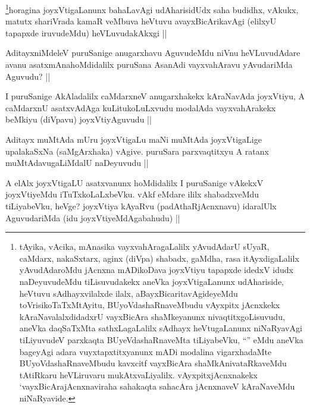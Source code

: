 \begin{artha}
\footnote[1]{tAyika, vAcika, mAnasika vayxvahAragaLalilx yAvudAdarU sUyaR, caMdarx, nakaSxtarx, aginx (diVpa) shabadx, gaMdha, rasa itAyxdigaLalilx yAvudAdaroMdu jAcnxna mADikoDava joyxVtiyu tapapxde idedxV idudx naDeyuvudeMdu tiLisuvudakekx aneVka joyxVtigaLanunx udAhariside, heVtuvu sAdhayxvilalxde ilalx, aBayxBicaritavAgideyeMdu toVrisikoTaTxMtAyitu, BUyoVdashaRnaveMbudu vAyxpitx jAcnxkekx kAraNavalalxdidadxrU vayxBicAra shaMkeyanunx nivaqtitxgoLisuvudu, aneVka daqSaTxMta sathxLagaLalilx sAdhayx heVtugaLanunx niNaRyavAgi tiLiyuvudeV parxkaqta BUyeVdashaRnaveMta tiLiyabeVku, ``\stext'' eMdu aneVka bageyAgi adara vuyxtapxtitxyanunx mADi modalina vigarxhadaMte BUyoVdashaRnaveMbudu kavxcitf vayxBicAra shaMkAnivataRkaveMdu tAtiRkaru heVLiruvaru mukAtxvaLiyalilx. vAyxpitxjAcnxnakekx `vayxBicArajAcnxnaviraha sahakaqta sahacAra jAcnxnaveV kAraNaveMdu niNaRyavide.}horagina joyxVtigaLanunx bahaLavAgi udAharisidUdx saha budidhx, vAkukx, matutx shariVrada kamaR veMbuva heVtuvu avayxBicArikavAgi (elilxyU tapapxde iruvudeMdu) heVLuvudakAkxgi ||
\end{artha}

\begin{artha}
AditayxniMdeleV puruSanige anugarxhavu AguvudeMdu niVnu heVLuvudAdare avanu asatxmAnahoMdidalilx puruSana AsanAdi vayxvahAravu yAvudariMda Aguvudu? ||
\end{artha}

\begin{artha}
I puruSanige AkAladalilx caMdarxneV anugarxhakekx kAraNavAda joyxVtiyu, A caMdarxnU asatxvAdAga kuLitukoLuLxvudu modalAda vayxvahArakekx beMkiyu (diVpavu) joyxVtiyAguvudu ||
\end{artha}

\begin{artha}
Aditayx muMtAda mUru joyxVtigaLu maNi muMtAda joyxVtigaLige upalakaSxNa (saMgArxhaka) vAgive. puruSara parxvaqtitxyu A ratanx muMtAdavugaLiMdalU naDeyuvudu ||
\end{artha}

\begin{artha}
A elAlx joyxVtigaLU asatxvanunx hoMdidalilx I puruSanige vAkekxV joyxVtiyeMdu iTuTxkoLaLxbeVku. vAkf eMdare ililx shabadxveMdu tiLiyabeVku, heVge? joyxVtiya kAyaRvu (padAthaRjAcnxnavu) idaralUlx AguvudariMda (idu joyxVtiyeMdAgabahudu) ||
\end{artha}

